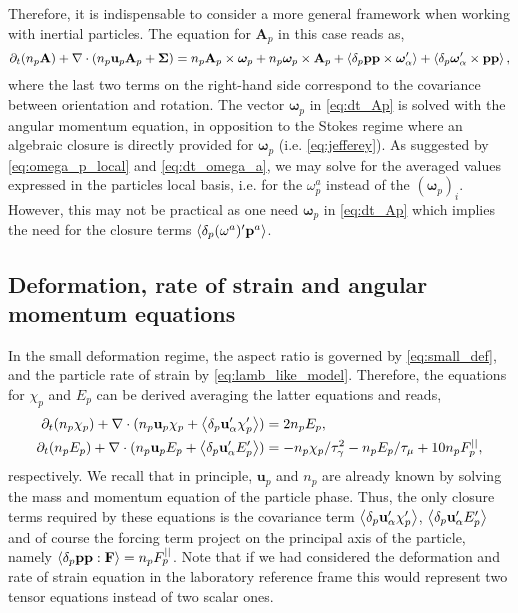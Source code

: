 Therefore, it is indispensable to consider a more general framework when working with inertial particles. 
The equation for $\textbf{A}_p$ in this case reads as, 
\begin{equation}
    \pddt (n_p\textbf{A})
    + \div (
        n_p\textbf{u}_p\textbf{A}_p
        + \mathbf{\Sigma}
        )
    =
    n_p \textbf{A}_p \times \bm\omega_p
    + n_p \bm\omega_p \times \textbf{A}_p
    + \pavg{\textbf{pp} \times \bm\omega_\alpha'}
    + \pavg{\bm\omega_\alpha' \times \textbf{pp}},
    \label{eq:dt_Ap}
\end{equation}
where the last two terms on the right-hand side correspond to the covariance between orientation and rotation. 
The vector $\bm\omega_p$ in \ref{eq:dt_Ap} is solved with the angular momentum equation, in opposition to the Stokes regime where an algebraic closure is directly provided for $\bm\omega_p$ (i.e. \ref{eq:jefferey}). 
As suggested by \ref{eq:omega_p_local} and \ref{eq:dt_omega_a}, we may solve for the averaged values expressed in the particles local basis, i.e. for the $\omega^a_p$ instead of the $(\bm\omega_p)_i$.
However, this may not be practical as one need $\bm\omega_p$ in \ref{eq:dt_Ap} which implies the need for the closure terms $\left<\delta_p (\omega^a)' \textbf{p}^a\right>$.


\subsection{Deformation, rate of strain and angular momentum equations}

In the small deformation regime, the aspect ratio is governed by \ref{eq:small_def}, and the particle rate of strain by  \ref{eq:lamb_like_model}. 
Therefore, the equations for $\chi_p$ and $E_p$ can be derived averaging the latter equations and reads,  
\begin{align}
    \pddt (n_p \chi_p)
    + \div (
        n_p \textbf{u}_p \chi_p 
        + \pavg{\textbf{u}_\alpha' \chi_p'}
    )
    &= 2 n_p E_p,
    \label{eq:avg_chi_I}
    \\
    \pddt (n_p E_p)
    + \div (
        n_p \textbf{u}_p E_p 
        + \pavg{\textbf{u}_\alpha' E_p'}
    )
    &= 
    -  n_p \chi_p / \tau_\gamma^2
    - n_p E_p / \tau_\mu
    + 10 n_p F^{||}_p,
    \label{eq:avg_E_I}
\end{align}
respectively.
We recall that in principle, $\textbf{u}_p$ and $n_p$ are already known by solving the mass and momentum equation of the particle phase.
Thus, the only closure terms required by these equations is the covariance term $\left<\delta_p \textbf{u}_\alpha' \chi_p'\right>$, $ \left<\delta_p \textbf{u}_\alpha' E_p'\right>$ and of course the forcing term project on the principal axis of the particle, namely $\left<\delta_p \textbf{pp} : \textbf{F}\right> = n_p F_p^{||}$. 
Note that if we had considered the deformation and rate of strain equation in the laboratory reference frame this would represent two tensor equations instead of two scalar ones. 


